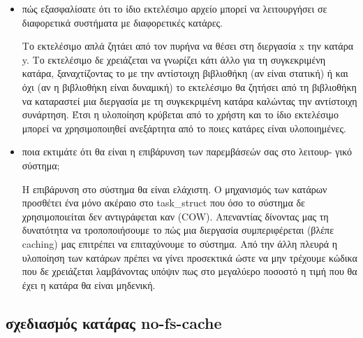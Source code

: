 \documentclass[a4paper,11pt]{article} \usepackage{anysize}
\begin{document}
\begin{itemize}
    \item πώς εξασφαλίσατε ότι το ίδιο εκτελέσιμο αρχείο μπορεί να λειτουργήσει σε διαφορετικά συστήματα με διαφορετικές κατάρες.

        Το εκτελέσιμο απλά ζητάει από τον πυρήνα να θέσει στη διεργασία x την
        κατάρα y. Το εκτελέσιμο δε χρειάζεται να γνωρίζει κάτι άλλο για τη
        συγκεκριμένη κατάρα, ξαναχτίζοντας το με την αντίστοιχη βιβλιοθήκη (αν
        είναι στατική) ή και όχι (αν η βιβλιοθήκη είναι δυναμική) το
        εκτελέσιμο θα ζητήσει από τη βιβλιοθήκη να καταραστεί μια διεργασία με
        τη συγκεκριμένη κατάρα καλώντας την αντίστοιχη συνάρτηση. Έτσι η
        υλοποίηση κρύβεται από το χρήστη και το ίδιο εκτελέσιμο μπορεί να
        χρησιμοποιηθεί ανεξάρτητα από το ποιες κατάρες είναι υλοποιημένες.

    \item ποια εκτιμάτε ότι θα είναι η επιβάρυνση των παρεμβάσεών σας στο λειτουρ- γικό σύστημα;

        Η επιβάρυνση στο σύστημα θα είναι ελάχιστη. Ο μηχανισμός των κατάρων
        προσθέτει ένα μόνο ακέραιο στο task\_struct που όσο το σύστημα
        δε χρησιμοποιείται δεν αντιγράφεται καν (COW). Απεναντίας δίνοντας μας
        τη δυνατότητα να τροποποιήσουμε το πώς μια διεργασία συμπεριφέρεται
        (βλέπε caching) μας επιτρέπει να επιταχύνουμε το σύστημα. Από την άλλη
        πλευρά η υλοποίηση των κατάρων πρέπει να γίνει προσεκτικά ώστε να μην
        τρέχουμε κώδικα που δε χρειάζεται λαμβάνοντας υπόψιν πως στο μεγαλύερο
        ποσοστό η τιμή που θα έχει η κατάρα θα είναι μηδενική.

\end{itemize}
\subsection*{σχεδιασμός κατάρας no-fs-cache}
\end{document}
